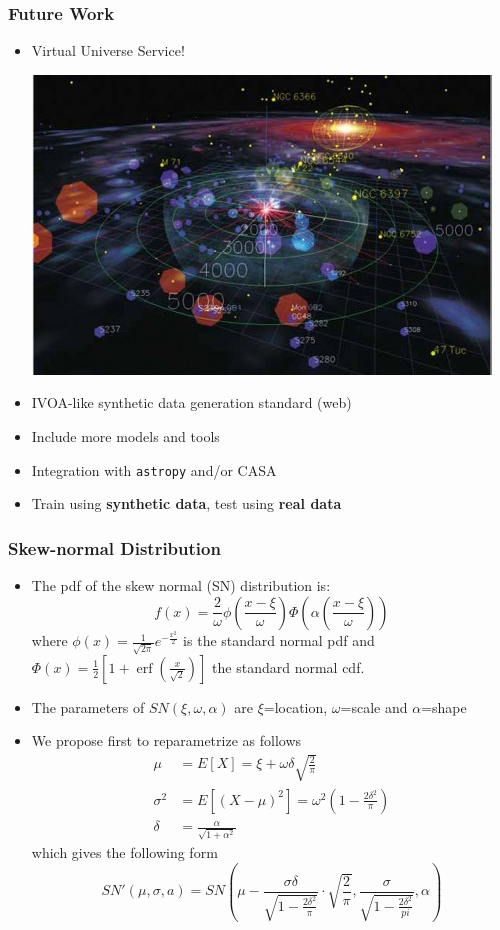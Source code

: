 \documentclass[slidestop,compress,mathserif,color,12pt]{beamer}
\begin{document}
\begin{frame}
  \frametitle{Future Work}
\scriptsize
\begin{itemize}
\item Virtual Universe Service!
\centerline{\includegraphics[width=0.45\linewidth]{digital_universe.jpg}}
\item IVOA-like synthetic data generation standard (web)
\item Include more models and tools
\item Integration with \texttt{astropy} and/or CASA
\item Train using \textbf{synthetic data}, test using \textbf{real data}
\end{itemize}
\end{frame}

\begin{frame}
  \titlepage
\end{frame}

\begin{frame}
  \frametitle{Skew-normal Distribution}
\scriptsize
\begin{itemize}
\item The pdf of the skew normal (SN) distribution is:
\begin{equation}
f(x) = \frac{2}{\omega}\phi\left(\frac{x-\xi}{\omega}\right)\Phi\left(\alpha
\left(\frac{x-\xi}{\omega}\right)\right)
\end{equation}
where $\phi(x)=\frac{1}{\sqrt{2\pi}}e^{-\frac{x^2}{2}}$ is the standard normal
pdf and $\Phi(x) = \frac{1}{2} \left[ 1 +
\operatorname{erf} \left(\frac{x}{\sqrt{2}}\right)\right]$ the standard normal
cdf.
\item The parameters of $SN(\xi,\omega,\alpha)$ are $\xi$=location,
$\omega$=scale and $\alpha$=shape
\item We propose first to reparametrize as follows
\begin{align}
\mu & =  E[X]  = \xi + \omega\delta\sqrt{\frac{2}{\pi}}\\
\sigma^2 & = E[(X-\mu)^2] = \omega^2\left(1 - \frac{2\delta^2}{\pi}\right) \\
\delta & = \frac{\alpha}{\sqrt{1+\alpha^2}}
\end{align}
which gives the following form
\begin{equation}
SN'(\mu,\sigma,a) = SN\left(\mu - \frac{\sigma \delta}{\sqrt{1 - \frac{2\delta^2}{\pi}}}
\cdot \sqrt{\frac{2}{\pi}} , \frac{\sigma}{\sqrt{1 -
\frac{2\delta^2}{pi}}},\alpha\right)
\end{equation}
\end{itemize}
\end{frame}
\end{document}
